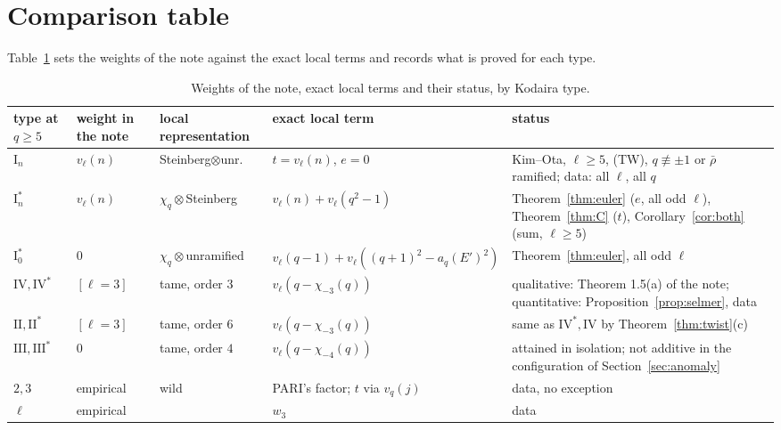 \documentclass[11pt]{amsart}
\theoremstyle{definition}
\begin{document}
\section{Comparison table}\label{sec:table}
Table~\ref{tab:cmp} sets the weights of the note against the exact local terms and records what is proved for each type.
\begin{table}[htbp]\centering\footnotesize
\begin{tabular}{p{2.1cm}p{1.6cm}p{2.5cm}p{3.1cm}p{3.8cm}}
\toprule
type at $q\ge5$ & weight in the note & local representation & exact local term & status\\
\midrule
$\mathrm{I}_n$ & $v_\ell(n)$ & Steinberg$\otimes$unr. & $t=v_\ell(n)$, $e=0$ & Kim--Ota, $\ell\ge5$, (TW), $q\not\equiv\pm1$ or $\bar\rho$ ramified; data: all $\ell$, all $q$\\
$\mathrm{I}_n^*$ & $v_\ell(n)$ & $\chi_q\otimes$Steinberg & $v_\ell(n)+v_\ell(q^2-1)$ & Theorem~\ref{thm:euler} ($e$, all odd $\ell$), Theorem~\ref{thm:C} ($t$), Corollary~\ref{cor:both} (sum, $\ell\ge5$)\\
$\mathrm{I}_0^*$ & $0$ & $\chi_q\otimes$unramified & $v_\ell(q-1)+v_\ell((q+1)^2-a_q(E')^2)$ & Theorem~\ref{thm:euler}, all odd $\ell$\\
$\mathrm{IV},\mathrm{IV}^*$ & $[\ell=3]$ & tame, order $3$ & $v_\ell(q-\chi_{-3}(q))$ & qualitative: Theorem 1.5(a) of the note; quantitative: Proposition~\ref{prop:selmer}, data\\
$\mathrm{II},\mathrm{II}^*$ & $[\ell=3]$ & tame, order $6$ & $v_\ell(q-\chi_{-3}(q))$ & same as $\mathrm{IV}^*,\mathrm{IV}$ by Theorem~\ref{thm:twist}(c)\\
$\mathrm{III},\mathrm{III}^*$ & $0$ & tame, order $4$ & $v_\ell(q-\chi_{-4}(q))$ & attained in isolation; not additive in the configuration of Section~\ref{sec:anomaly}\\
$2,3$ & empirical & wild & PARI's factor; $t$ via $v_q(j)$ & data, no exception\\
$\ell$ & empirical & & $w_3$ & data\\
\bottomrule
\end{tabular}
\caption{Weights of the note, exact local terms and their status, by Kodaira type.}\label{tab:cmp}
\end{table}
\end{document}
